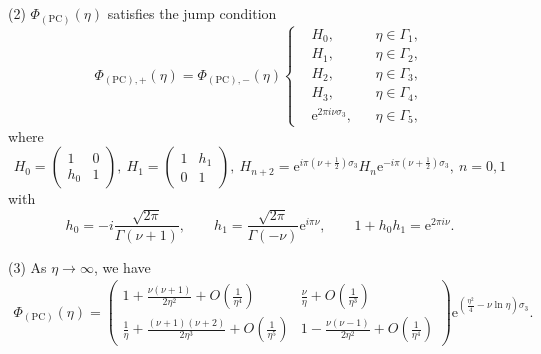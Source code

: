 \documentclass[11pt,a4paper]{article}
\numberwithin{equation}{section}
\begin{document}
\begin{appendices}
\begin{description}
\item{(2)} $\Phi_\mathrm{(PC)}(\eta)$ satisfies the jump condition
\begin{equation}\label{PCjumpmatrices}
\Phi_{(\mathrm{PC}),+}(\eta)=\Phi_{(\mathrm{PC}),-}(\eta)\left\{\begin{aligned}
&H_0,\quad && \eta \in\Gamma_1, \\
&H_1,\quad && \eta \in\Gamma_2, \\
&H_2,\quad && \eta \in\Gamma_3, \\
&H_3,\quad && \eta \in\Gamma_4, \\
&\mathrm{e}^{2\pi i\nu\sigma_3}, && \eta \in\Gamma_5,
\end{aligned}\right.
\end{equation}
where
$$
H_{0}=\begin{pmatrix}1 & 0 \\ h_{0} & 1\end{pmatrix}, \
H_{1}=\begin{pmatrix}1 & h_{1} \\ 0 & 1\end{pmatrix}, \
H_{n+2}=\mathrm{e}^{i \pi\left(\nu+\frac{1}{2}\right) \sigma_{3}} H_{n}
\mathrm{e}^{-i \pi\left(\nu+\frac{1}{2}\right) \sigma_{3}}, \ n=0,1
$$
with
\begin{equation}\label{h0}
h_{0}=-i \frac{\sqrt{2 \pi}}{\Gamma(\nu+1)}, \qquad h_{1}=\frac{\sqrt{2 \pi}}{\Gamma(-\nu)}\mathrm{e}^{i\pi\nu}, \qquad 1+h_{0}h_{1}=\mathrm{e}^{2\pi i\nu}.
\end{equation}
\item{(3)}
As $\eta \to \infty$, we have
\begin{align}\label{PCAsyatinfty}
\Phi_\mathrm{(PC)}(\eta)=\begin{pmatrix}
1+\frac{\nu(\nu+1)}{2\eta^2}+O\left(\frac{1}{\eta^4}\right) & \frac{\nu}{\eta}+O\left(\frac{1}{\eta^3}\right) \\[.2cm] \frac{1}{\eta}+\frac{(\nu+1)(\nu+2)}{2\eta^3}+O\left(\frac{1}{\eta^5}\right) & 1-\frac{\nu(\nu-1)}{2\eta^2}+O\left(\frac{1}{\eta^4}\right)\end{pmatrix}
\mathrm{e}^{\left(\frac{\eta^{2}}{4}-\nu\ln\eta\right) \sigma_{3}}.
\end{align}
\end{description}


\end{appendices}
\end{document}
